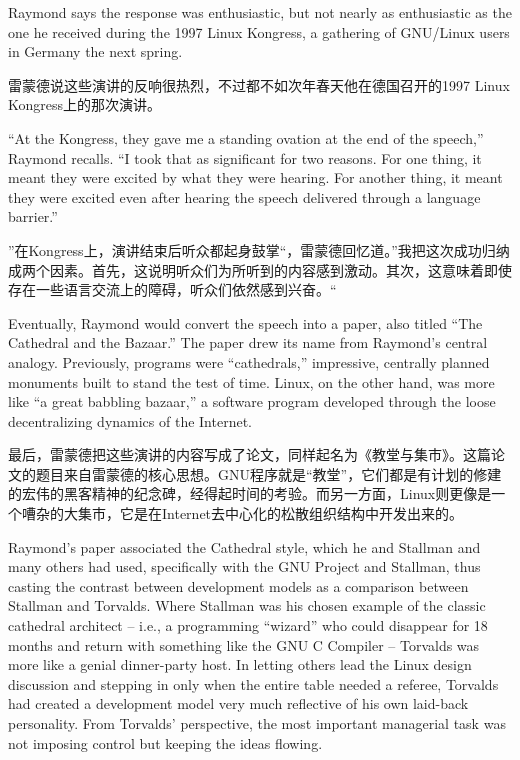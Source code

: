 \ifdefined\eng
Raymond says the response was enthusiastic, but not nearly as enthusiastic as the one he received during the 1997 Linux Kongress, a gathering of GNU/Linux users in Germany the next spring.
\fi

\ifdefined\chs
雷蒙德说这些演讲的反响很热烈，不过都不如次年春天他在德国召开的1997 Linux Kongress上的那次演讲。
\fi

\ifdefined\eng
``At the Kongress, they gave me a standing ovation at the end of the speech,'' Raymond recalls. ``I took that as significant for two reasons. For one thing, it meant they were excited by what they were hearing. For another thing, it meant they were excited even after hearing the speech delivered through a language barrier.''
\fi

\ifdefined\chs
”在Kongress上，演讲结束后听众都起身鼓掌“，雷蒙德回忆道。”我把这次成功归纳成两个因素。首先，这说明听众们为所听到的内容感到激动。其次，这意味着即使存在一些语言交流上的障碍，听众们依然感到兴奋。“
\fi

\ifdefined\eng
Eventually, Raymond would convert the speech into a paper, also titled ``The Cathedral and the Bazaar.'' The paper drew its name from Raymond's central analogy. Previously, programs were ``cathedrals,'' impressive, centrally planned monuments built to stand the test of time. Linux, on the other hand, was more like ``a great babbling bazaar,'' a software program developed through the loose decentralizing dynamics of the Internet.
\fi

\ifdefined\chs
最后，雷蒙德把这些演讲的内容写成了论文，同样起名为《教堂与集市》。这篇论文的题目来自雷蒙德的核心思想。GNU程序就是“教堂”，它们都是有计划的修建的宏伟的黑客精神的纪念碑，经得起时间的考验。而另一方面，Linux则更像是一个嘈杂的大集市，它是在Internet去中心化的松散组织结构中开发出来的。
\fi

\ifdefined\eng
Raymond's paper associated the Cathedral style, which he and Stallman and many others had used, specifically with the GNU Project and Stallman, thus casting the contrast between development models as a comparison between Stallman and Torvalds. Where Stallman was his chosen example of the classic cathedral architect -- i.e., a programming ``wizard'' who could disappear for 18 months and return with something like the GNU C Compiler -- Torvalds was more like a genial dinner-party host. In letting others lead the Linux design discussion and stepping in only when the entire table needed a referee, Torvalds had created a development model very much reflective of his own laid-back personality. From Torvalds' perspective, the most important managerial task was not imposing control but keeping the ideas flowing.
\fi

